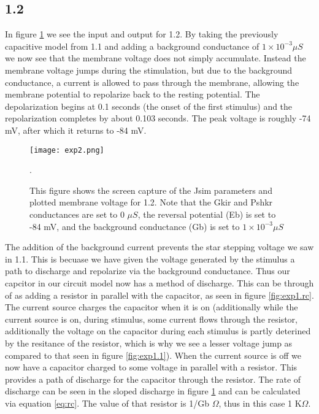 \documentclass[12pt]{article}
\begin{document}
\subsection{1.2}
\par{}
In figure \ref{fig:exp1.2} we see the input and output for 1.2. By taking the previously capacitive model from 1.1 and adding a background conductance of \ensuremath{1\times{}10^{-3}\mu S} we now see that the membrane voltage does not simply accumulate. Instead the membrane voltage jumps during the stimulation, but due to the background conductance, a current is allowed to pass through the membrane, allowing the membrane potential to repolarize back to the resting potential. The depolarization begins at 0.1 seconds (the onset of the first stimulus) and the repolarization completes by about 0.103 seconds. The peak voltage is roughly -74 mV, after which it returns to -84 mV.

\begin{figure}[H]
	\centering
	\centering
	\texttt{[image: exp2.png]}
	\caption{This figure shows the screen capture of the Jsim parameters and plotted membrane voltage for 1.2. Note that the Gkir and Pshkr conductances are set to 0 \ensuremath{\mu S}, the reversal potential (Eb) is set to -84 mV, and the background conductance (Gb) is set to \ensuremath{1\times{}10^{-3}\mu S}}.
	\label{fig:exp1.2}
\end{figure}

\par{}
The addition of the background current prevents the star stepping voltage we saw in 1.1. This is becuase we have given the voltage generated by the stimulus a path to discharge and repolarize via the background conductance. Thus our capcitor in our circuit model now has a method of discharge. This can be through of as adding a resistor in parallel with the capacitor, as seen in figure \ref{fig:exp1.rc}. The current source charges the capacitor when it is on (additionally while the current source is on, during stimulus, some current flows through the resistor, additionally the voltage on the capacitor during each stimulus is partly deterined by the resitance of the resistor, which is why we see a lesser voltage jump as compared to that seen in figure \ref{fig:exp1.1}). When the current source is off we now have a capacitor charged to some voltage in parallel with a resistor. This provides a path of discharge for the capacitor through the resistor. The rate of discharge can be seen in the sloped discharge in figure \ref{fig:exp1.2} and can be calculated via equation \ref{eq:rc}. The value of that resistor is 1/Gb $\Omega$, thus in this case 1 K$\Omega$. 
\end{document}
